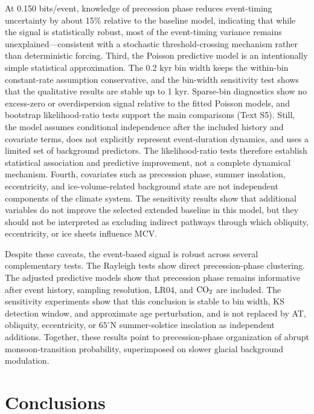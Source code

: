\documentclass[11pt]{article}
\begin{document}
At 0.150 bits/event, knowledge of precession phase reduces event-timing uncertainty by about 15\% relative to the baseline model, indicating that while the signal is statistically robust, most of the event-timing variance remains unexplained---consistent with a stochastic threshold-crossing mechanism rather than deterministic forcing. Third, the Poisson predictive model is an intentionally simple statistical approximation. The 0.2 kyr bin width keeps the within-bin constant-rate assumption conservative, and the bin-width sensitivity test shows that the qualitative results are stable up to 1 kyr. Sparse-bin diagnostics show no excess-zero or overdispersion signal relative to the fitted Poisson models, and bootstrap likelihood-ratio tests support the main comparisons (Text S5). Still, the model assumes conditional independence after the included history and covariate terms, does not explicitly represent event-duration dynamics, and uses a limited set of background predictors. The likelihood-ratio tests therefore establish statistical association and predictive improvement, not a complete dynamical mechanism. Fourth, covariates such as precession phase, summer insolation, eccentricity, and ice-volume-related background state are not independent components of the climate system. The sensitivity results show that additional variables do not improve the selected extended baseline in this model, but they should not be interpreted as excluding indirect pathways through which obliquity, eccentricity, or ice sheets influence MCV.

Despite these caveats, the event-based signal is robust across several complementary tests. The Rayleigh tests show direct precession-phase clustering. The adjusted predictive models show that precession phase remains informative after event history, sampling resolution, LR04, and \(\ce{CO2}\) are included. The sensitivity experiments show that this conclusion is stable to bin width, KS detection window, and approximate age perturbation, and is not replaced by AT, obliquity, eccentricity, or \(65^\circ\)N summer-solstice insolation as independent additions. Together, these results point to precession-phase organization of abrupt monsoon-transition probability, superimposed on slower glacial background modulation.

\section*{Conclusions}
\end{document}
